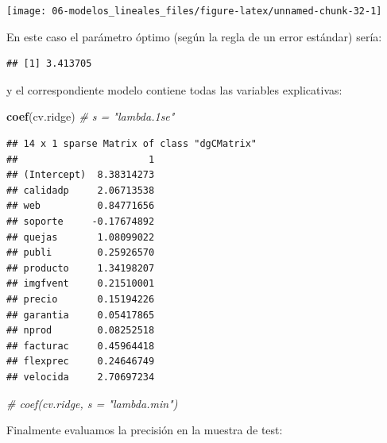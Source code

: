 \documentclass[
  spanish,
]{book}
\newenvironment{Shaded}{\begin{snugshade}}{\end{snugshade}}
\newcommand{\CommentTok}[1]{\textcolor[rgb]{0.56,0.35,0.01}{\textit{#1}}}
\newcommand{\FloatTok}[1]{\textcolor[rgb]{0.00,0.00,0.81}{#1}}
\newcommand{\KeywordTok}[1]{\textcolor[rgb]{0.13,0.29,0.53}{\textbf{#1}}}
\newcommand{\NormalTok}[1]{#1}
\newcommand{\OperatorTok}[1]{\textcolor[rgb]{0.81,0.36,0.00}{\textbf{#1}}}
\theoremstyle{break}
\theoremstyle{definition}
\theoremstyle{definition}
\theoremstyle{definition}
\theoremstyle{remark}
\begin{document}
\begin{center}\texttt{[image: 06-modelos\_lineales\_files/figure-latex/unnamed-chunk-32-1]} \end{center}

En este caso el parámetro óptimo (según la regla de un error estándar) sería:

\begin{Shaded}
\end{Shaded}

\begin{verbatim}
## [1] 3.413705
\end{verbatim}

\begin{Shaded}
\end{Shaded}

y el correspondiente modelo contiene todas las variables explicativas:

\begin{Shaded}
\begin{Highlighting}[]
\KeywordTok{coef}\NormalTok{(cv.ridge) }\CommentTok{# s = "lambda.1se"}
\end{Highlighting}
\end{Shaded}

\begin{verbatim}
## 14 x 1 sparse Matrix of class "dgCMatrix"
##                       1
## (Intercept)  8.38314273
## calidadp     2.06713538
## web          0.84771656
## soporte     -0.17674892
## quejas       1.08099022
## publi        0.25926570
## producto     1.34198207
## imgfvent     0.21510001
## precio       0.15194226
## garantia     0.05417865
## nprod        0.08252518
## facturac     0.45964418
## flexprec     0.24646749
## velocida     2.70697234
\end{verbatim}

\begin{Shaded}
\begin{Highlighting}[]
\CommentTok{# coef(cv.ridge, s = "lambda.min")}
\end{Highlighting}
\end{Shaded}

Finalmente evaluamos la precisión en la muestra de test:
\end{document}
